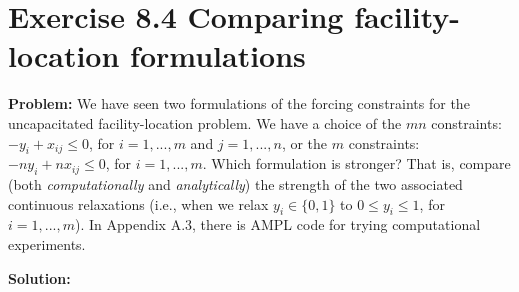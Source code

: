 \section{Exercise 8.4 Comparing facility-location formulations}
\textbf{Problem:} We have seen two formulations of the forcing constraints for the uncapacitated facility-location problem. We have a choice of the $mn$ constraints: $−y_{i} + x_{ij} \leq 0$, for $i=1, ..., m$ and $j=1,..., n$, or the $m$ constraints: $−ny_{i}+nx_{ij} \leq 0$, for $i=1,...,m$. Which formulation is stronger? That is, compare (both \textit{computationally} and \textit{analytically}) the strength of the two associated continuous relaxations (i.e., when we relax $y_{i}\in{}\lbrace0,1\rbrace$ to $0\leq{}y_{i}\leq1$, for $i=1,...,m$).  In Appendix A.3, there is AMPL code for trying computational experiments.

\textbf{Solution:} 